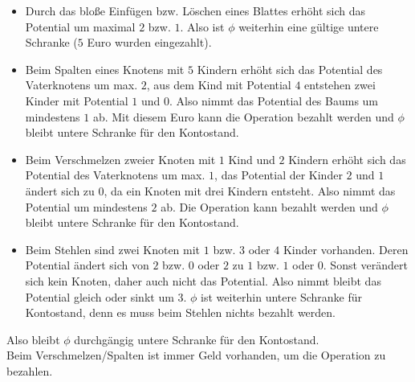 \pagebreak

\begin{Beweis}
    \begin{itemize}
        \item
        Durch das bloße Einfügen bzw. Löschen eines Blattes erhöht sich
        das Potential um maximal $2$ bzw. $1$.
        Also ist $\phi$ weiterhin eine gültige untere Schranke
        ($5$ Euro wurden eingezahlt).
        
        \item
        Beim Spalten eines Knotens mit $5$ Kindern erhöht sich das
        Potential des Vaterknotens um max. $2$, aus dem Kind mit Potential
        $4$ entstehen zwei Kinder mit Potential $1$ und $0$.
        Also nimmt das Potential des Baums um mindestens $1$ ab.
        Mit diesem Euro kann die Operation bezahlt werden und $\phi$ bleibt
        untere Schranke für den Kontostand.
        
        \item
        Beim Verschmelzen zweier Knoten mit $1$ Kind und $2$ Kindern
        erhöht sich das Potential des Vaterknotens um max. $1$, das Potential
        der Kinder $2$ und $1$ ändert sich zu $0$, da ein Knoten mit
        drei Kindern entsteht.
        Also nimmt das Potential um mindestens $2$ ab.
        Die Operation kann bezahlt werden und $\phi$ bleibt
        untere Schranke für den Kontostand.
        
        \item
        Beim Stehlen sind zwei Knoten mit $1$ bzw. $3$ oder $4$ Kinder
        vorhanden.
        Deren Potential ändert sich von $2$ bzw. $0$ oder $2$ zu
        $1$ bzw. $1$ oder $0$.
        Sonst verändert sich kein Knoten, daher auch nicht das Potential.
        Also nimmt bleibt das Potential gleich oder sinkt um $3$.
        $\phi$ ist weiterhin untere Schranke für Kontostand, denn
        es muss beim Stehlen nichts bezahlt werden.
    \end{itemize}
    Also bleibt $\phi$ durchgängig untere Schranke für den Kontostand. \\
    Beim Verschmelzen/Spalten ist immer Geld vorhanden, um die Operation
    zu bezahlen.
\end{Beweis}

\pagebreak
